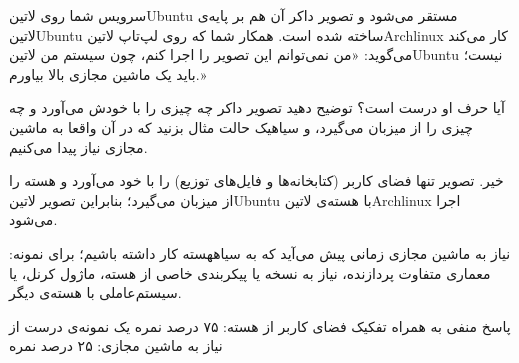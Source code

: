 
سرویس شما روی ‌لاتین{Ubuntu} مستقر می‌شود و تصویر داکر آن هم بر پایه‌ی ‌لاتین{Ubuntu} ساخته شده است.
همکار شما که روی لپ‌تاپ ‌لاتین{Archlinux} کار می‌کند می‌گوید:
«من نمی‌توانم این تصویر را اجرا کنم، چون سیستم من ‌لاتین{Ubuntu} نیست؛ باید یک ماشین مجازی بالا بیاورم.»

آیا حرف او درست است؟ توضیح دهید تصویر داکر چه چیزی را با خودش می‌آورد و چه چیزی را از میزبان می‌گیرد،
و ‌سیاه{یک} حالت مثال بزنید که در آن واقعا به ماشین مجازی نیاز پیدا می‌کنیم.


\begin{پاسخ}

خیر. تصویر تنها فضای کاربر (کتابخانه‌ها و فایل‌های توزیع) را با خود می‌آورد و هسته را از میزبان می‌گیرد؛
بنابراین تصویر ‌لاتین{Ubuntu} با هسته‌ی ‌لاتین{Archlinux} اجرا می‌شود.

نیاز به ماشین مجازی زمانی پیش می‌آید که به ‌سیاه{هسته} کار داشته باشیم؛ برای نمونه:
معماری متفاوت پردازنده، نیاز به نسخه یا پیکربندی خاصی از هسته، ماژول کرنل، یا سیستم‌عاملی با هسته‌ی دیگر.

 پاسخ منفی به همراه تفکیک فضای کاربر از هسته: ۷۵ درصد نمره
 یک نمونه‌ی درست از نیاز به ماشین مجازی: ۲۵ درصد نمره

\end{پاسخ}

